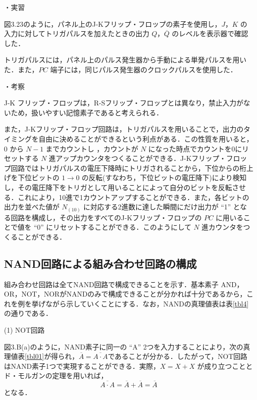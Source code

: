 \vspace{7mm}
\noindent
・実習 \vspace{2mm}

図3.23のように，パネル上のJ-Kフリップ・フロップの素子を使用し，$J$，$K$ の入力に対してトリガパルスを加えたときの出力 $Q$，$\overline{Q}$ のレベルを表示器で確認した．

トリガパルスには，パネル上のパルス発生器から手動による単発パルスを用いた．また，$PC$ 端子には，同じパルス発生器のクロックパルスを使用した．

\vspace{7mm}
\noindent
・考察 \vspace{2mm}

J-K フリップ・フロップは，R-Sフリップ・フロップとは異なり，禁止入力がないため，扱いやすい記憶素子であると考えられる．


また，J-Kフリップ・フロップ回路は，トリガパルスを用いることで，出力のタイミングを自由に決めることができるという利点がある．この性質を用いると，0 から $N-1$ までカウントし
，カウントが $N$ になった時点でカウントを0にリセットする $N$ 進アップカウンタをつくることができる．J-Kフリップ・フロップ回路ではトリガパルスの電圧下降時にトリガされることから，下位からの桁上げを下位ビットの $1 \rightarrow 0$ の反転(すなわち，下位ビットの電圧降下)により検知し，その電圧降下をトリガとして用いることによって自分のビットを反転させる．これにより，10進で1カウントアップすることができる．また，各ビットの出力を並べた値が $N_{(10)}$ に対応する2進数に達した瞬間にだけ出力が ``1'' となる回路を構成し，その出力をすべてのJ-Kフリップ・フロップの $PC$ に用いることで値を ``0'' にリセットすることができる．このようにして $N$ 進カウンタをつくることができる．
\newpage
\subsection{NAND回路による組み合わせ回路の構成}

組み合わせ回路は全てNAND回路で構成できることを示す．基本素子 AND，OR，NOT，NORがNANDのみで構成できることが分かれば十分であるから，これを例を挙げながら示していくことにする．なお，NANDの真理値表は表\ref{tbl4}の通りである．

\vspace{7mm}
\noindent
(1) NOT回路 \vspace{2mm}

図3.B(a)のように，NAND素子に同一の ``A'' 2つを入力することにより，次の真理値表\ref{tbl01}が得られ，$\overline{A} = \overline{A \cdot A}$であることが分かる．したがって，NOT回路はNAND素子1つで実現することができる．実際，$X = X + X$ が成り立つこととド・モルガンの定理を用いれば，
$$
    \overline{A \cdot A} = \overline{A} + \overline{A} = \overline{A}
$$
となる．

